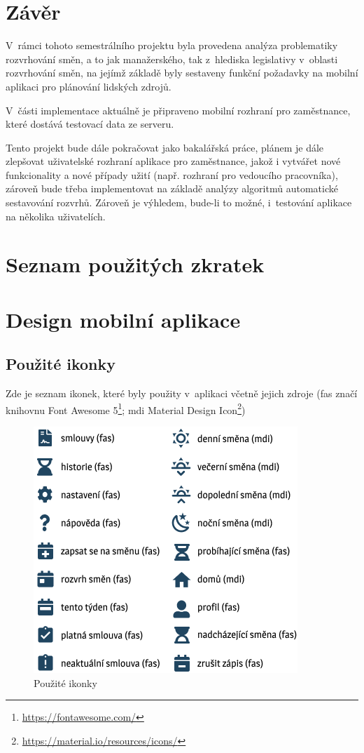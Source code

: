 \documentclass[twoside]{ctuthesis}
\begin{document}
\chapter{Závěr}

V~rámci tohoto semestrálního projektu byla provedena analýza problematiky rozvrhování směn, a to jak manažerského, tak z~hlediska legislativy v~oblasti rozvrhování směn, na jejímž základě byly sestaveny funkční požadavky na mobilní aplikaci pro plánování lidských zdrojů.

V~části implementace aktuálně je připraveno mobilní rozhraní pro za\-měst\-nan\-ce, které dostává testovací data ze serveru.

Tento projekt bude dále pokračovat jako bakalářská práce, plánem je dále zlepšovat uživatelské rozhraní aplikace pro zaměstnance, jakož i vytvářet nové funkcionality a nové případy užití (např. rozhraní pro vedoucího pracovníka), zároveň bude třeba implementovat na základě analýzy algoritmů automatické sestavování rozvrhů. Zároveň je výhledem, bude-li to možné, i~testování aplikace na několika uživatelích.

\printbibliography[title={Seznam použité literatury}]

\appendix

\chapter{Seznam použitých zkratek}
\glsaddall
\printnoidxglossaries

\chapter{Design mobilní aplikace}\label{app:design}



\section{Použité ikonky}
Zde je seznam ikonek, které byly použity v~aplikaci včetně jejich zdroje (fas značí knihovnu Font Awesome 5\footnote{\url{https://fontawesome.com/}}; mdi Material Design Icon\footnote{\url{https://material.io/resources/icons/}})
\begin{figure}[h!]
	\includegraphics[scale=.7]{img/icons.png}
	\caption{Použité ikonky}
	\label{fig:icons}
\end{figure}
\newpage
\end{document}
